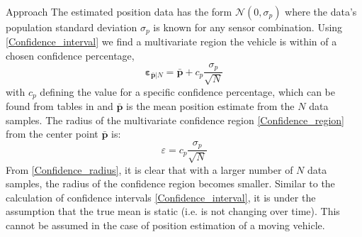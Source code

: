 \begin{section}{Approach}
The estimated position data has the form $\mathcal{N}(0,\sigma_p)$ where the data's population standard deviation $\sigma_p$ is known for any sensor combination. Using \eqref{Confidence_interval} we find a multivariate region the vehicle is within of a chosen confidence percentage,
    \begin{equation}
    \label{Confidence_region}
		\bm{\varepsilon}_{\bar{\bm{p}}|N} = \bar{\bm{p}} + c_p\frac{\sigma_p}{\sqrt{N}}
	\end{equation}
with $c_p$ defining the value for a specific confidence percentage, which can be found from tables in \cite{devore2011probability} and $\bar{\bm{p}}$ is the mean position estimate from the $N$ data samples. The radius of the multivariate confidence region \eqref{Confidence_region} from the center point $\bar{\bm{p}}$ is:
    \begin{equation}
    \label{Confidence_radius}
		\varepsilon = c_p\frac{\sigma_p}{\sqrt{N}}
	\end{equation}
From \eqref{Confidence_radius}, it is clear that with a larger number of $N$ data samples, the radius of the confidence region becomes smaller. Similar to the calculation of confidence intervals \eqref{Confidence_interval}, it is under the assumption that the true mean is static (i.e. is not changing over time). This cannot be assumed in the case of position estimation of a moving vehicle. 




\end{section}
